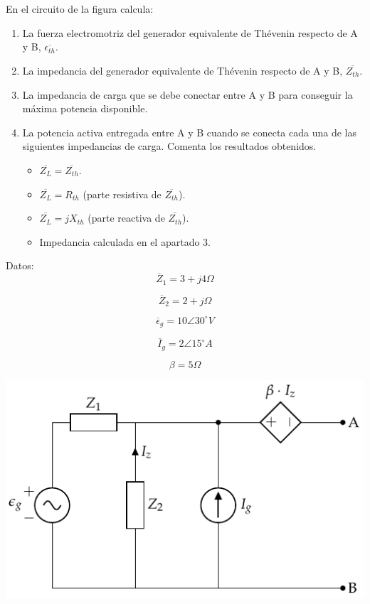 \documentclass[12pt]{article}
\begin{document}
\clearpage

\section{}

En el circuito de la figura calcula:

\begin{enumerate}
\item La fuerza electromotriz del generador equivalente de Thévenin respecto de A y B,  \(\overline{\epsilon_{th}}\).
\item La impedancia del generador equivalente de Thévenin respecto de A y B, \(\overline{Z_{th}}\).
\item La impedancia de carga que se debe conectar entre A y B para conseguir la máxima potencia disponible.
\item La potencia activa entregada entre A y B cuando se conecta cada una de las siguientes impedancias de carga. Comenta los resultados obtenidos.
\begin{itemize}
\item \(\overline{Z_L} = \overline{Z_{th}}\).
\item \(\overline{Z_L} = R_{th}\) (parte resistiva de \(\overline{Z_{th}}\)).
\item \(\overline{Z_L} = j X_{th}\) (parte reactiva de \(\overline{Z_{th}}\)).
\item Impedancia calculada en el apartado 3.
\end{itemize}
\end{enumerate}

\begin{minipage}{0.3\linewidth}
Datos:
\[
\overline{Z}_1 = 3 + j4\Omega
\]

\[
\overline{Z}_2 = 2 + j\Omega
\]

\[
\overline{\epsilon}_g = 10\angle 30^{\circ} V 
\]

\[
\overline{I}_g = 2\angle 15^{\circ} A
\]

\[
\beta = 5 \Omega
\]
\end{minipage}
\begin{minipage}{0.7\linewidth}
\includegraphics[width=.9\linewidth]{../figs/thevenin6.pdf}
\end{minipage}
\end{document}
